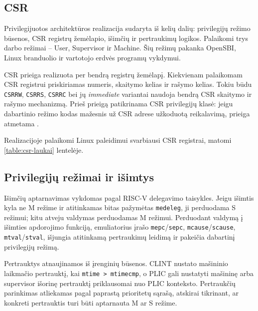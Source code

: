 \subsection{CSR}
\label{sec:csr-ir-isimtys}

Privilegijuotos architektūros realizacija sudaryta iš kelių dalių: privilegijų režimo būsenos, CSR registrų žemėlapio, išimčių ir pertraukimų logikos. Palaikomi trys darbo režimai -- User, Supervisor ir Machine. Šių režimų pakanka OpenSBI, Linux branduolio ir vartotojo erdvės programų vykdymui.

CSR prieiga realizuota per bendrą registrų žemėlapį. Kiekvienam palaikomam CSR registrui priskiriamas numeris, skaitymo kelias ir rašymo kelias. Tokiu būdu \texttt{CSRRW}, \texttt{CSRRS}, \texttt{CSRRC} bei jų \textit{immediate} variantai naudoja bendrą CSR skaitymo ir rašymo mechanizmą. Prieš prieigą patikrinama CSR privilegijų klasė: jeigu dabartinio režimo kodas mažesnis už CSR adrese užkoduotą reikalavimą, prieiga atmetama \cite[p.~13]{riscv-privileged-20260120}.

Realizacijoje palaikomi Linux paleidimui svarbiausi CSR registrai, matomi \ref{table:csr-laukai} lentelėje.



\subsection{Privilegijų režimai ir išimtys}

Išimčių aptarnavimas vykdomas pagal RISC-V delegavimo taisykles. Jeigu išimtis kyla ne M režime ir atitinkamas bitas pažymėtas \texttt{medeleg}, ji perduodama S režimui; kitu atveju valdymas perduodamas M režimui. Perduodant valdymą į išimties apdorojimo funkciją, emuliatorius įrašo \texttt{mepc}/\texttt{sepc}, \texttt{mcause}/\texttt{scause}, \texttt{mtval}/\texttt{stval}, išjungia atitinkamą pertraukimų leidimą ir pakeičia dabartinį privilegijų režimą.

Pertrauktys atnaujinamos iš įrenginių būsenos. CLINT nustato mašininio laikmačio pertrauktį, kai \texttt{mtime > mtimecmp}, o PLIC gali nustatyti mašininę arba supervisor išorinę pertrauktį priklausomai nuo PLIC konteksto. Pertraukčių parinkimas atliekamas pagal paprastą prioritetų sąrašą, atskirai tikrinant, ar konkreti pertrauktis turi būti aptarnauta M ar S režime.
